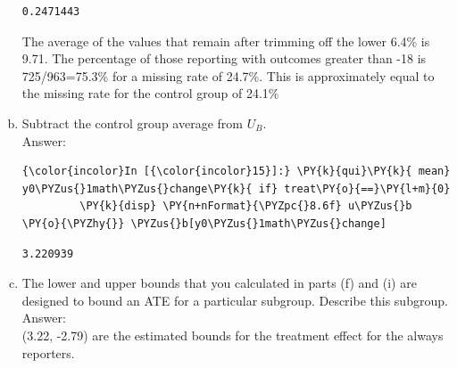 \documentclass[11pt,notitlepage]{article}\usepackage[]{graphicx}\usepackage[]{color}
\makeatletter
\newenvironment{kframe}{%
 \def\at@end@of@kframe{}%
 \ifinner\ifhmode%
  \def\at@end@of@kframe{\end{minipage}}%
  \begin{minipage}{\columnwidth}%
 \fi\fi%
 \def\FrameCommand##1{\hskip\@totalleftmargin \hskip-\fboxsep
 \colorbox{shadecolor}{##1}\hskip-\fboxsep
     \hskip-\linewidth \hskip-\@totalleftmargin \hskip\columnwidth}%
 \MakeFramed {\advance\hsize-\width
   \@totalleftmargin\z@ \linewidth\hsize
   \@setminipage}}%
 {\par\unskip\endMakeFramed%
 \at@end@of@kframe}
\newenvironment{knitrout}{}{} %
\makeatother
\begin{document}
\begin{enumerate}[a)]
\begin{knitrout}
\begin{kframe}
    \begin{Verbatim}[commandchars=\\\{\}]
0.2471443

    \end{Verbatim}
\end{kframe}
\end{knitrout}

The average of the values that remain after trimming off the lower 6.4\% is 9.71. The percentage of those reporting with outcomes greater than -18 is 725/963=75.3\% for a missing rate of 24.7\%. This is approximately equal to the missing rate for the control group of 24.1\%

\item Subtract the control group average from $U_B$.\\
Answer:\\
\begin{knitrout}
\color{fgcolor}\begin{kframe}
   \begin{Verbatim}[commandchars=\\\{\}]
{\color{incolor}In [{\color{incolor}15}]:} \PY{k}{qui}\PY{k}{ mean} y0\PYZus{}1math\PYZus{}change\PY{k}{ if} treat\PY{o}{==}\PY{l+m}{0} 
         \PY{k}{disp} \PY{n+nFormat}{\PYZpc{}8.6f} u\PYZus{}b \PY{o}{\PYZhy{}} \PYZus{}b[y0\PYZus{}1math\PYZus{}change]
\end{Verbatim}

    \begin{Verbatim}[commandchars=\\\{\}]
3.220939
    \end{Verbatim}
\end{kframe}
\end{knitrout}



\item The lower and upper bounds that you calculated in parts (f) and (i) are designed to bound an ATE for a particular subgroup. Describe this subgroup.\\
Answer:\\
(3.22, -2.79) are the estimated bounds for the treatment effect for the always reporters. 


\end{enumerate}
\end{document}
